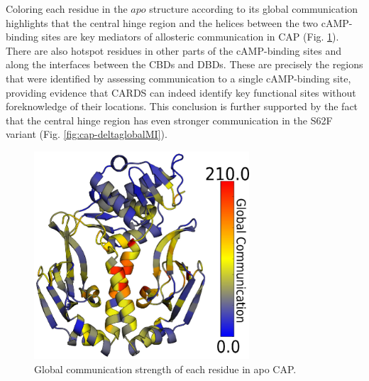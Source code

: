 \documentclass[../main.tex]{subfiles}
\begin{document}
        Coloring each residue in the $apo$ structure according to its global communication highlights that the central hinge region and the helices between the two cAMP-binding sites are key mediators of allosteric communication in CAP (Fig. \ref{fig:cap-global-mi-fig}). There are also hotspot residues in other parts of the cAMP-binding sites and along the interfaces between the CBDs and DBDs. These are precisely the regions that were identified by assessing communication to a single cAMP-binding site, providing evidence that CARDS can indeed identify key functional sites without foreknowledge of their locations. This conclusion is further supported by the fact that the central hinge region has even stronger communication in the S62F variant (Fig. \ref{fig:cap-deltaglobalMI}).

    \begin{figure}[!htb] %
        \centering
        \includegraphics[width=3.16in]{cap-global-mi-fig.eps}
        \caption[Global communication strength of each residue in apo CAP.]{Global communication strength of each residue in apo CAP.}
        \label{fig:cap-global-mi-fig}
    \end{figure} 
\end{document}
